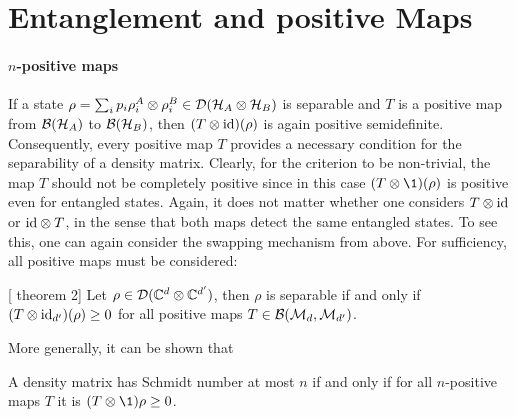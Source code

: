 \chapter{Entanglement and positive Maps}\label{ch:entanglement}
\subsubsection{$n$-positive maps}
If a state $\rho =\sum_i p_i \rho_i^A\otimes \rho_i^B \in \mathcal D(\mathcal{H}_A \otimes \mathcal{H}_B)$ is separable and $T$ is a positive map from $\mathcal B(\mathcal{H}_A)$ to $\mathcal B(\mathcal{H}_B)$, then $(T\otimes \mathrm{id})(\rho)$ is again positive semidefinite. Consequently, every positive map $T$ provides a necessary condition for the separability of a density matrix. Clearly, for the criterion to be non-trivial, the map $T$ should not be completely positive since in this case $(T\otimes \1)(\rho)$ is positive even for entangled states. Again, it does not matter whether one considers $T \otimes \mathrm{id} $ or $\mathrm{id} \otimes T$, in the sense that both maps detect the same entangled states. To see this, one can again consider the swapping mechanism from above. For sufficiency, all positive maps must be considered:
\begin{theorem}\label{thm:positive-maps}[\cite{Horodecki1996} theorem 2]
    Let $\rho \in \mathcal D(\mathbb{C}^d \otimes \mathbb{C}^{d'})$, then $\rho$ is separable if and only if $(T\otimes \mathrm{id}_{d'})(\rho)\geq 0$ for all positive maps $T \in \mathcal B(\mathcal M_d, \mathcal M_{d'})$.{}
\end{theorem}
More generally, it can be shown that
\begin{theorem}\label{thm:n-pos}
    A density matrix has Schmidt number at most $n$ if and only if for all $n$-positive maps $T$ it is $(T \otimes \1)\rho \geq 0$. {}
\end{theorem}

